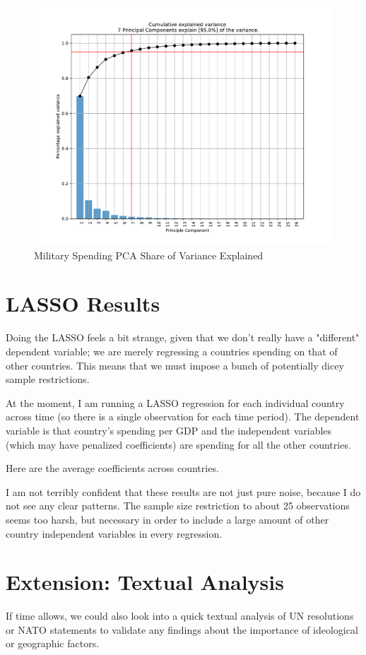 \documentclass{report}
\begin{document}
	\begin{figure}[h!]
		\centering
		\caption{Military Spending PCA Share of Variance Explained}
		\label{Milex_PC_Share_Explained}	
		\includegraphics[width=\linewidth,keepaspectratio=true]{../Output/Figures/Milex_PC_Share_Explained.pdf}
	\end{figure}

	\section*{LASSO Results}

	Doing the LASSO feels a bit strange, given that we don't really have a "different" dependent variable; we are merely regressing a countries spending on that of other countries. This means that we must impose a bunch of potentially dicey sample restrictions. 
	
	At the moment, I am running a LASSO regression for each individual country across time (so there is a single observation for each time period). The dependent variable is that country's spending per GDP and the independent variables (which may have penalized coefficients) are spending for all the other countries.

	Here are the average coefficients across countries.

	I am not terribly confident that these results are not just pure noise, because I do not see any clear patterns. The sample size restriction to about 25 observations seems too harsh, but necessary in order to include a large amount of other country independent variables in every regression.

    \section*{Extension: Textual Analysis}

	If time allows, we could also look into a quick textual analysis of UN resolutions or NATO statements to validate any findings about the importance of ideological or geographic factors.
\end{document}
